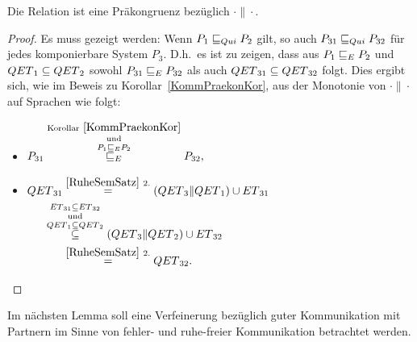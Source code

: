 \begin{Kor}
  \label{RuhePraekonKor}
  Die Relation \QRel{} ist eine Präkongruenz bezüglich $\cdot\|\cdot$.
\end{Kor}
\begin{proof}
  Es muss gezeigt werden: Wenn $P_1 \sqsubseteq  _{Qui} P_2$ gilt, so auch $P_{31} \sqsubseteq  _{Qui}
  P_{32}$ für jedes komponierbare System $P_3$. D.h.\ es ist zu zeigen, dass
  aus $P_1 \sqsubseteq  _E P_2$ und $QET{}_1\subseteq QET{}_2$ sowohl $P_{31} \sqsubseteq  _E
  P_{32}$ als auch $QET{}_{31}\subseteq QET{}_{32}$ folgt. Dies ergibt sich,
  wie im Beweis zu Korollar~\ref{KommPraekonKor}, aus der Monotonie von
  $\cdot\|\cdot$ auf Sprachen wie folgt:
  \begin{itemize}
    \item $\begin{aligned}[t]
        P_{31} \overset{\mathrm{Korollar}~\ref{KommPraekonKor}}{
          \overset{\mathrm{und}}{\overset{P_1 \sqsubseteq  _E P_2}{ \sqsubseteq  _E}}}
        P_{32},
    \end{aligned}$
    \item $\begin{aligned}[t]
        \QET{}_{31} &\overset{\ref{RuheSemSatz}~2.}{=}
        (\QET{}_3\|\QET{}_1)\cup \ET{}_{31}\\
        &\hspace{-0.6cm}\overset{\ET{}_{31}\subseteq
      \ET{}_{32}}{\overset{\mathrm{und}}{\overset{\QET{}_1\subseteq
      \QET{}_2}{\subseteq}}} (\QET{}_3\|\QET{}_2) \cup \ET{}_{32}\\
        &\overset{\ref{RuheSemSatz}~2.}{=} \QET{}_{32}.
    \end{aligned}$
  \vspace*{-0.7cm}
  \end{itemize}
\end{proof}

Im nächsten Lemma soll eine Verfeinerung bezüglich guter Kommunikation mit
Partnern im Sinne von fehler- und ruhe-freier Kommunikation betrachtet werden.

